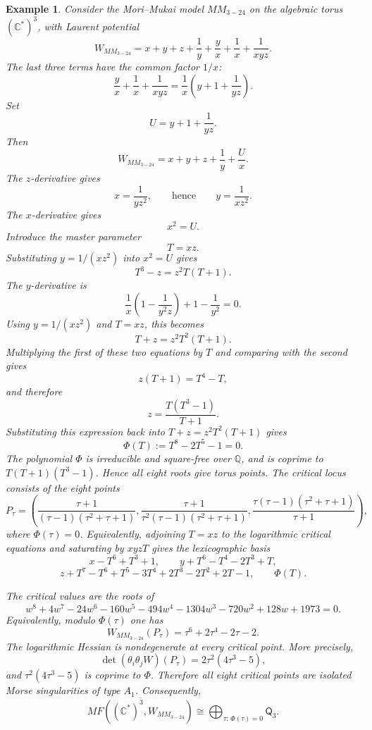 \documentclass[11pt]{amsart}
\newtheorem{example}{Example}[section]
\newcommand{\MorseCat}[1]{\mathsf{Q}_{#1}}
\begin{document}
\begin{example}
Consider the Mori--Mukai model $MM_{3-24}$ on the algebraic torus
$(\mathbb{C}^*)^3$, with Laurent potential
\[
W_{MM_{3-24}}=x+y+z+\frac{1}{y}+\frac{y}{x}+\frac{1}{x}
+\frac{1}{xyz}.
\]
The last three terms have the common factor $1/x$:
\[
\frac{y}{x}+\frac{1}{x}+\frac{1}{xyz}
=\frac{1}{x}\left(y+1+\frac{1}{yz}\right).
\]
Set
\[
U=y+1+\frac{1}{yz}.
\]
Then
\[
W_{MM_{3-24}}=x+y+z+\frac{1}{y}+\frac{U}{x}.
\]
The $z$-derivative gives
\[
x=\frac{1}{yz^2},
\qquad\text{hence}\qquad
y=\frac{1}{xz^2}.
\]
The $x$-derivative gives
\[
x^2=U.
\]
Introduce the master parameter
\[
T=xz.
\]
Substituting $y=1/(xz^2)$ into $x^2=U$ gives
\[
T^3-z=z^2T(T+1).
\]
The $y$-derivative is
\[
\frac{1}{x}\left(1-\frac{1}{y^2z}\right)+1-\frac{1}{y^2}=0.
\]
Using $y=1/(xz^2)$ and $T=xz$, this becomes
\[
T+z=z^2T^2(T+1).
\]
Multiplying the first of these two equations by $T$ and comparing with the
second gives
\[
z(T+1)=T^4-T,
\]
and therefore
\[
z=\frac{T(T^3-1)}{T+1}.
\]
Substituting this expression back into $T+z=z^2T^2(T+1)$ gives
\[
\Phi(T):=T^8-2T^5-1=0.
\]
The polynomial $\Phi$ is irreducible and square-free over $\mathbb{Q}$, and is
coprime to $T(T+1)(T^3-1)$. Hence all eight roots give torus points. The
critical locus consists of the eight points
\[
P_\tau=\left(
\frac{\tau+1}{(\tau-1)(\tau^2+\tau+1)},
\frac{\tau+1}{\tau^2(\tau-1)(\tau^2+\tau+1)},
\frac{\tau(\tau-1)(\tau^2+\tau+1)}{\tau+1}
\right),
\]
where $\Phi(\tau)=0$. Equivalently, adjoining $T=xz$ to the logarithmic
critical equations and saturating by $xyzT$ gives the lexicographic basis
\[
x-T^6+T^3+1,
\qquad
y+T^6-T^4-2T^3+T,
\]
\[
z+T^7-T^6+T^5-3T^4+2T^3-2T^2+2T-1,
\qquad
\Phi(T).
\]

The critical values are the roots of
\[
w^8+4w^7-24w^6-160w^5-494w^4-1304w^3
-720w^2+128w+1973=0.
\]
Equivalently, modulo $\Phi(\tau)$ one has
\[
W_{MM_{3-24}}(P_\tau)=\tau^6+2\tau^4-2\tau-2.
\]
The logarithmic Hessian is nondegenerate at every critical point. More
precisely,
\[
\det(\theta_i\theta_jW)(P_\tau)=2\tau^2(4\tau^3-5),
\]
and $\tau^2(4\tau^3-5)$ is coprime to $\Phi$. Therefore all eight critical
points are isolated Morse singularities of type $A_1$. Consequently,
\[
\overline{MF((\mathbb{C}^*)^3,W_{MM_{3-24}})}
\cong \bigoplus_{\tau:\,\Phi(\tau)=0}\MorseCat{3}.
\]
\end{example}
\end{document}
